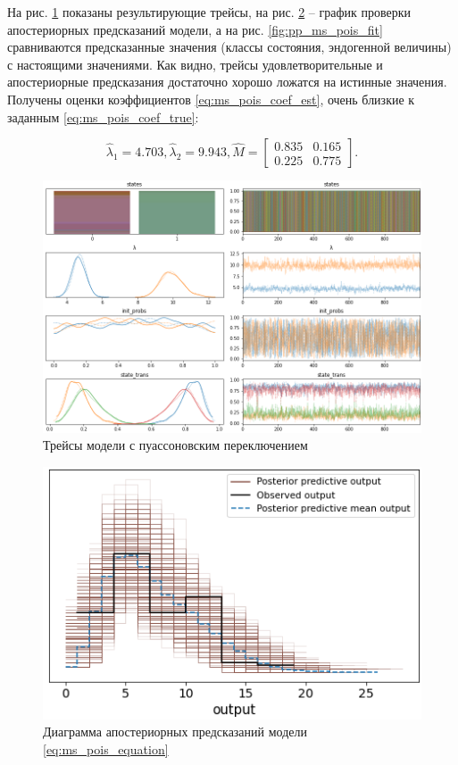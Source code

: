 \documentclass[a4paper,14pt]{extreport}
\begin{document}
На рис. \ref{fig:pp_ms_pois_trace} показаны результирующие трейсы, на рис.  \ref{fig:pp_ms_pois_ppc} -- график проверки апостериорных предсказаний модели, а на рис. \ref{fig:pp_ms_pois_fit} сравниваются предсказанные значения (классы состояния, эндогенной величины) с настоящими значениями. Как видно, трейсы удовлетворительные и апостериорные предсказания достаточно хорошо ложатся на истинные значения. Получены оценки коэффициентов \ref{eq:ms_pois_coef_est}, очень близкие к заданным \ref{eq:ms_pois_coef_true}:

\begin{equation}
	\label{eq:ms_pois_coef_est}
	\hat{\lambda}_1 = 4.703, 
	\hat{\lambda}_2 = 9.943,
	\hat{M}= \left[ {\begin{array}{cc}
					0.835 & 0.165 \\
					0.225 & 0.775
				\end{array} } \right]
	.
\end{equation}

\begin{figure}[H]
	\includegraphics[width=\linewidth]{img/gen/pp_ms_pois_trace.png}
	\caption{Трейсы модели с пуассоновским переключением}
	\label{fig:pp_ms_pois_trace}
\end{figure}

\begin{figure}[H]
	\includegraphics[width=\linewidth]{img/gen/pp_ms_pois_ppc.png}
	\caption{Диаграмма апостериорных предсказаний модели \ref{eq:ms_pois_equation}}
	\label{fig:pp_ms_pois_ppc}
\end{figure}
\end{document}
